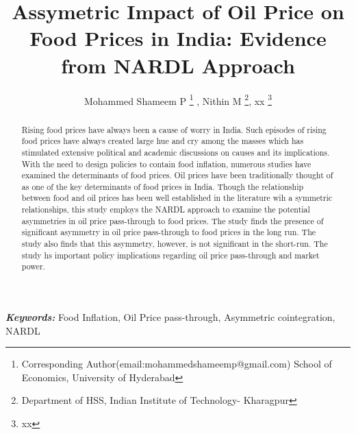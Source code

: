 \documentclass[a4paper,12pt]{article}
\title{Assymetric Impact of Oil Price on Food Prices in India: Evidence from NARDL Approach}
\author{%
Mohammed Shameem P \thanks{Corresponding Author(email:mohammedshameemp@gmail.com) School of Economics, University of Hyderabad} ,
Nithin M \thanks{Department of HSS, Indian Institute of Technology- Kharagpur},
xx \thanks{xx}
}
\date{}
\providecommand{\keywords}[1]
{
	\small	
	\textbf{\textit{Keywords:}} #1
}
\begin{document}
\maketitle

\begin{abstract}
Rising food prices have always been a cause of worry in India. Such episodes of rising food prices have always created large hue and cry among the masses which has stimulated extensive political and academic discussions on causes and its implications. With the need to design policies to contain food inflation, numerous studies have examined the determinants of food prices. Oil prices have been traditionally thought of as one of the key determinants of food prices in India. Though the relationship between food and oil prices has been well established in the literature wih a symmetric relationships, this study employs the NARDL approach to examine the potential asymmetries in oil price pass-through to food prices. The study finds the presence of significant asymmetry in oil price pass-through to food prices in the long run. The study also finds that this asymmetry, however, is not significant in the short-run. The study hs important policy implications regarding oil price pass-through and market power. 
\end{abstract}

\keywords{Food Inflation, Oil Price pass-through, Asymmetric cointegration, NARDL}	
\end{document}
